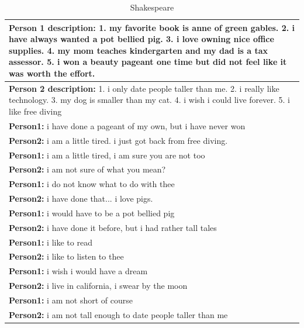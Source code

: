 \begin{table}[ht]
\centering
 \begin{tabular}{|p{14cm}|} 
 \hline\hline
 \textbf{Person 1 description:} 1. my favorite book is anne of green gables. 2. i have always wanted a pot bellied pig. 3. i love owning nice office supplies. 4. my mom teaches kindergarten and my dad is a tax assessor. 5. i won a beauty pageant one time but did not feel like it was worth the effort. \\
 \hline
 \textbf{Person 2 description:} 1. i only date people taller than me. 2. i really like technology. 3. my dog is smaller than my cat. 4. i wish i could live forever. 5. i like free diving \\
 \hline\hline
 \textbf{Person1:} i have done a pageant of my own, but i have never won  \\
 \textbf{Person2:} i am a little tired. i just got back from free diving. \\ 
 \textbf{Person1:} i am a little tired, i am sure you are not too\\
 \textbf{Person2:} i am not sure of what you mean?\\
 \textbf{Person1:} i do not know what to do with thee \\
 \textbf{Person2:} i have done that... i love pigs. \\
 \textbf{Person1:} i would have to be a pot bellied pig  \\
 \textbf{Person2:} i have done it before, but i had rather tall tales \\
 \textbf{Person1:} i like to read \\
 \textbf{Person2:} i like to listen to thee \\
 \textbf{Person1:} i wish i would have a dream \\
 \textbf{Person2:} i live in california, i swear by the moon \\
 \textbf{Person1:} i am not short of course \\
 \textbf{Person2:} i am not tall enough to date people taller than me \\
 \hline\hline
 \end{tabular}
 \caption{Shakespeare}
\label{tab:shake}
\end{table}

